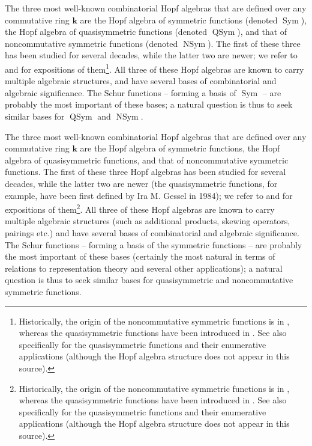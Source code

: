 \documentclass
[numbers=enddot,12pt,final,onecolumn,notitlepage,abstracton]{scrartcl}%
\theoremstyle{definition}
\newenvironment{verlong}{}{}
\newenvironment{vershort}{}{}
\begin{document}
\begin{vershort}
The three most well-known combinatorial Hopf algebras that are defined over
any commutative ring $\mathbf{k}$ are the Hopf algebra of symmetric functions
(denoted $\operatorname*{Sym}$), the Hopf algebra of quasisymmetric functions
(denoted $\operatorname*{QSym}$), and that of noncommutative symmetric
functions (denoted $\operatorname*{NSym}$). The first of these three has been
studied for several decades, while the latter two are newer; we refer to
\cite[Chapters 4 and 6]{HGK} and \cite[Chapters 2 and 5]{Reiner} for
expositions of them\footnote{Historically, the origin of the noncommutative
symmetric functions is in \cite{NCSF1}, whereas the quasisymmetric functions
have been introduced in \cite{Gessel}. See also \cite[Section 7.19]%
{Stanley-EC2} specifically for the quasisymmetric functions and their
enumerative applications (although the Hopf algebra structure does not appear
in this source).}. All three of these Hopf algebras are known to carry
multiple algebraic structures, and have several bases of combinatorial and
algebraic significance. The Schur functions -- forming a basis of
$\operatorname*{Sym}$ -- are probably the most important of these bases; a
natural question is thus to seek similar bases for $\operatorname*{QSym}$ and
$\operatorname*{NSym}$.
\end{vershort}

\begin{verlong}
The three most well-known combinatorial Hopf algebras that are defined over
any commutative ring $\mathbf{k}$ are the Hopf algebra of symmetric functions,
the Hopf algebra of quasisymmetric functions, and that of noncommutative
symmetric functions. The first of these three Hopf algebras has been studied
for several decades, while the latter two are newer (the quasisymmetric
functions, for example, have been first defined by Ira M. Gessel in 1984); we
refer to \cite[Chapters 4 and 6]{HGK} and \cite[Chapters 2 and 5]{Reiner} for
expositions of them\footnote{Historically, the origin of the noncommutative
symmetric functions is in \cite{NCSF1}, whereas the quasisymmetric functions
have been introduced in \cite{Gessel}. See also \cite[Section 7.19]%
{Stanley-EC2} specifically for the quasisymmetric functions and their
enumerative applications (although the Hopf algebra structure does not appear
in this source).}. All three of these Hopf algebras are known to carry
multiple algebraic structures (such as additional products, skewing operators,
pairings etc.) and have several bases of combinatorial and algebraic
significance. The Schur functions -- forming a basis of the symmetric
functions -- are probably the most important of these bases (certainly the
most natural in terms of relations to representation theory and several other
applications); a natural question is thus to seek similar bases for
quasisymmetric and noncommutative symmetric functions.
\end{verlong}
\end{document}

